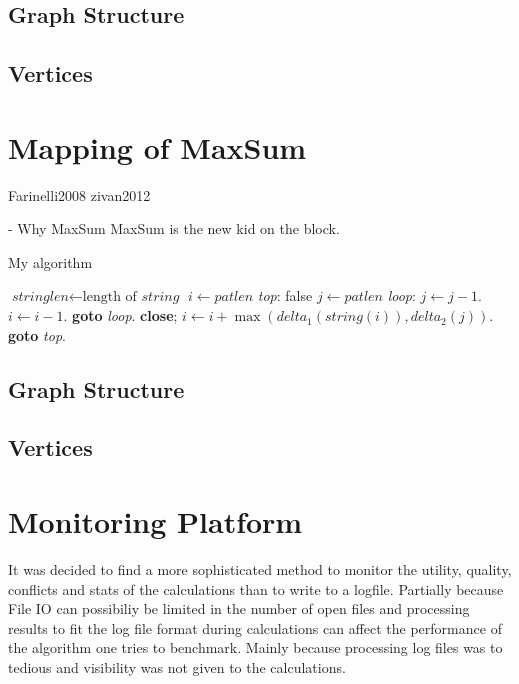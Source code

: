 \subsection{Graph Structure}
\subsection{Vertices}

\section{Mapping of MaxSum}

\cite{Yedidsion}
Farinelli2008
zivan2012
    
    - Why MaxSum
    MaxSum is the new kid on the block.

    \begin{algorithm}
\caption{My algorithm}\label{euclid}
\begin{algorithmic}[3]
\State $\textit{stringlen} \gets \text{length of }\textit{string}$
\State $i \gets \textit{patlen}$
\BState \emph{top}:
 \Return false
\EndIf
\State $j \gets \textit{patlen}$
\BState \emph{loop}:
\State $j \gets j-1$.
\State $i \gets i-1$.
\State \textbf{goto} \emph{loop}.
\State \textbf{close};
\EndIf
\State $i \gets i+\max(\textit{delta}_1(\textit{string}(i)),\textit{delta}_2(j))$.
\State \textbf{goto} \emph{top}.
\EndProcedure
\end{algorithmic}
\end{algorithm}

\subsection{Graph Structure}
\subsection{Vertices}

\section{Monitoring Platform}

It was decided to find a more sophisticated method to monitor the utility, quality, conflicts and stats of the calculations than to write to a logfile. Partially because File IO can possibiliy be limited in the number of open files and processing results to fit the log file format during calculations can affect the performance of the algorithm one tries to benchmark. Mainly because processing log files was to tedious and visibility was not given to the calculations.

